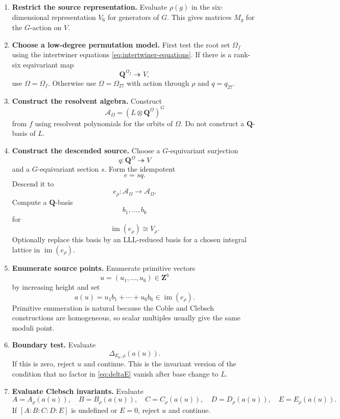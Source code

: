\documentclass[11pt]{article}
\newcommand{\QQ}{\mathbf{Q}}
\newcommand{\ZZ}{\mathbf{Z}}
\newcommand{\im}{\operatorname{im}}
\newcommand{\cA}{\mathcal{A}}
\newcommand{\V}{V_6}
\begin{document}
\begin{enumerate}[label=\textbf{Step \arabic*.}]
\item \textbf{Restrict the source representation.}
Evaluate $\rho(g)$ in the six-dimensional representation $\V$ for generators of
$G$.  This gives matrices $M_g$ for the $G$-action on $V$.

\item \textbf{Choose a low-degree permutation model.}
First test the root set $\Omega_f$ using the intertwiner equations
\eqref{eq:intertwiner-equations}.  If there is a rank-six equivariant map
\[
  \QQ^{\Omega_f}\twoheadrightarrow V,
\]
use $\Omega=\Omega_f$.  Otherwise use $\Omega=\Omega_{27}$ with action through
$\rho$ and $q=q_{27}$.

\item \textbf{Construct the resolvent algebra.}
Construct
\[
  \cA_\Omega=(L\otimes\QQ^\Omega)^G
\]
from $f$ using resolvent polynomials for the orbits of $\Omega$.  Do not construct
a $\QQ$-basis of $L$.

\item \textbf{Construct the descended source.}
Choose a $G$-equivariant surjection
\[
  q:\QQ^\Omega\twoheadrightarrow V
\]
and a $G$-equivariant section $s$.  Form the idempotent
\[
  e=sq.
\]
Descend it to
\[
  e_\rho:\cA_\Omega\to\cA_\Omega.
\]
Compute a $\QQ$-basis
\[
  b_1,\ldots,b_6
\]
for
\[
  \im(e_\rho)\cong V_\rho.
\]
Optionally replace this basis by an LLL-reduced basis for a chosen integral lattice
in $\im(e_\rho)$.

\item \textbf{Enumerate source points.}
Enumerate primitive vectors
\[
  u=(u_1,\ldots,u_6)\in\ZZ^6
\]
by increasing height and set
\[
  a(u)=u_1b_1+\cdots+u_6b_6\in \im(e_\rho).
\]
Primitive enumeration is natural because the Coble and Clebsch constructions are
homogeneous, so scalar multiples usually give the same moduli point.

\item \textbf{Boundary test.}
Evaluate
\[
  \Delta_{E_6,\rho}(a(u)).
\]
If this is zero, reject $u$ and continue.  This is the invariant version of the
condition that no factor in \eqref{eq:deltaE} vanish after base change to $L$.

\item \textbf{Evaluate Clebsch invariants.}
Evaluate
\[
  A=A_\rho(a(u)),\quad
  B=B_\rho(a(u)),\quad
  C=C_\rho(a(u)),\quad
  D=D_\rho(a(u)),\quad
  E=E_\rho(a(u)).
\]
If $[A:B:C:D:E]$ is undefined or $E=0$, reject $u$ and continue.


\end{enumerate}
\end{document}

